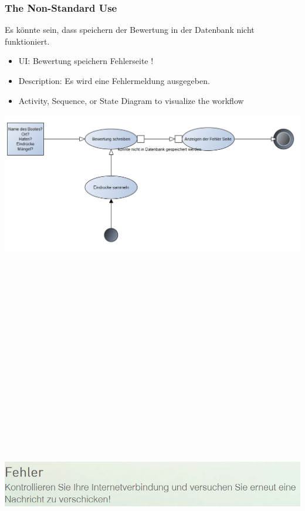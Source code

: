 \documentclass[12pt]{article}
\theoremstyle{definition}
\begin{document}
\subsubsection{The Non-Standard Use}
Es könnte sein, dass speichern der Bewertung in der Datenbank nicht funktioniert.
\begin{itemize}
	\item UI: Bewertung speichern Fehlerseite !
	\item Description: Es wird eine Fehlermeldung ausgegeben.
	\item Activity, Sequence, or State Diagram to visualize the workflow
\end{itemize}
\includegraphics[height=0.40\textwidth]{Bewertung_schreiben_Fehler.PNG}
\begin{center}\includegraphics[width=15cm,height=20cm,keepaspectratio]{Fehler2.PNG}\end{center}
\pagebreak
\end{document}
